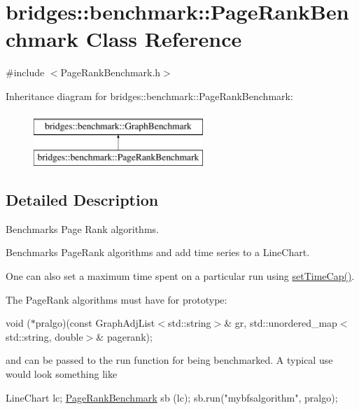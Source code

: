 \hypertarget{classbridges_1_1benchmark_1_1_page_rank_benchmark}{}\section{bridges\+:\+:benchmark\+:\+:Page\+Rank\+Benchmark Class Reference}
\label{classbridges_1_1benchmark_1_1_page_rank_benchmark}


{\ttfamily \#include $<$Page\+Rank\+Benchmark.\+h$>$}

Inheritance diagram for bridges\+:\+:benchmark\+:\+:Page\+Rank\+Benchmark\+:\begin{figure}[H]
\begin{center}
\leavevmode
\includegraphics[height=2.000000cm]{classbridges_1_1benchmark_1_1_page_rank_benchmark}
\end{center}
\end{figure}


\subsection{Detailed Description}
Benchmarks Page Rank algorithms. 

Benchmarks Page\+Rank algorithms and add time series to a Line\+Chart.

One can also set a maximum time spent on a particular run using \mbox{\hyperlink{classbridges_1_1benchmark_1_1_graph_benchmark_a56934eb2789e54c088e7b4423c3a7456}{set\+Time\+Cap()}}.

The Page\+Rank algorithms must have for prototype\+:

void ($\ast$pralgo)(const Graph\+Adj\+List$<$std\+::string$>$\& gr, std\+::unordered\+\_\+map$<$std\+::string, double$>$\& pagerank);

and can be passed to the run function for being benchmarked. A typical use would look something like


\begin{DoxyCode}
LineChart lc;
\mbox{\hyperlink{classbridges_1_1benchmark_1_1_page_rank_benchmark_acdb9d6913f7559656aaae6c1f579d18b}{PageRankBenchmark}} sb (lc);
sb.run(\textcolor{stringliteral}{"mybfsalgorithm"}, pralgo);
\end{DoxyCode}


